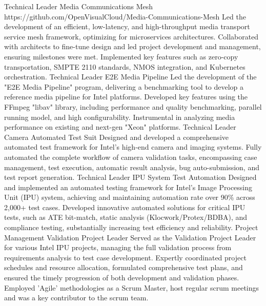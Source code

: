 \documentclass[9pt]{developercv} %
\begin{document}
\begin{entrylist}
    \entry
        {Technical \newline Leader}
		{Media Communications Mesh}
		{https://github.com/OpenVisualCloud/Media-Communications-Mesh}
        {Led the development of an efficient, low-latency, and high-throughput media transport service mesh framework, optimizing for microservices architectures. Collaborated with architects to fine-tune design and led project development and management, ensuring milestones were met. Implemented key features such as zero-copy transportation, SMPTE 2110 standards, NMOS integration, and Kubernetes orchestration.}
    \entry
        {Technical \newline Leader}
		{E2E Media Pipeline}
		{}
		{Led the development of the "E2E Media Pipeline" program, delivering a benchmarking tool to develop a reference media pipeline for Intel platforms.
        Developed key features using the FFmpeg "libav" library, including performance and quality benchmarking, parallel running model, and high configurability.
        Instrumental in analyzing media performance on existing and next-gen "Xeon" platforms.}
	\entry
        {Technical \newline Leader}
		{Camera Automated Test Suit}
		{}
        {Designed and developed a comprehensive automated test framework for Intel's high-end camera and imaging systems.
        Fully automated the complete workflow of camera validation tasks, encompassing case management, test execution, automatic result analysis, bug auto-submission, and test report generation.}
    \entry
		{Technical \newline Leader}
		{IPU System Test Automation}
		{}
        {Designed and implemented an automated testing framework for Intel's Image Processing Unit (IPU) system,
        achieving and maintaining automation rate over 90\% across 2,000+ test cases.
        Developed innovative automated solutions for critical IPU tests, such as ATE bit-match, static analysis (Klocwork/Protex/BDBA),
        and compliance testing, substantially increasing test efficiency and reliability.}
    \entry
		{Project \newline Management}
		{Validation Project Leader}
		{}
        {
        Served as the Validation Project Leader for various Intel IPU projects, managing the full validation
        process from requirements analysis to test case development.
        Expertly coordinated project schedules and resource allocation, formulated comprehensive test
        plans, and ensured the timely progression of both development and validation phases.
        Employed 'Agile' methodologies as a Scrum Master, host regular scrum meetings and was a key contributor to the scrum team.
        }
\end{entrylist}
\end{document}
